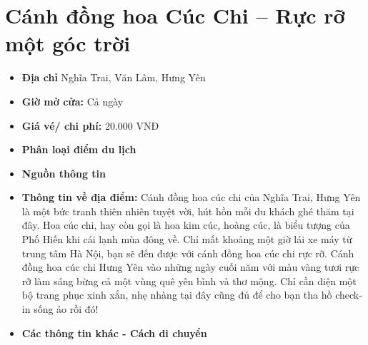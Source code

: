 \documentclass{article}
\begin{document}
\section{Cánh đồng hoa Cúc Chi – Rực rỡ một góc trời}
\begin{itemize}
    \item{\textbf{Địa chỉ}} Nghĩa Trai, Văn Lâm, Hưng Yên

    \item{\textbf{Giờ mở cửa:}} Cả ngày

    \item{\textbf{Giá vé/ chi phí:}} 20.000 VNĐ

    \item{\textbf{Phân loại điểm du lịch}}

    \item{\textbf{Nguồn thông tin}}

    \item{\textbf{Thông tin về địa điểm:}} Cánh đồng hoa cúc chi của Nghĩa Trai, Hưng Yên là một bức tranh thiên nhiên tuyệt vời, hút hồn mỗi du khách ghé thăm tại đây. Hoa cúc chi, hay còn gọi là hoa kim cúc, hoàng cúc, là biểu tượng của Phố Hiến khi cái lạnh mùa đông về. Chỉ mất khoảng một giờ lái xe máy từ trung tâm Hà Nội, bạn sẽ đến được với cánh đồng hoa cúc chi rực rỡ. Cánh đồng hoa cúc chi Hưng Yên vào những ngày cuối năm với màu vàng tươi rực rỡ làm sáng bừng cả một vùng quê yên bình và thơ mộng. Chỉ cần diện một bộ trang phục xinh xắn, nhẹ nhàng tại đây cũng đủ để cho bạn tha hồ check-in sống ảo rồi đó!
\end{itemize}

\begin{itemize}
    \item{\textbf{Các thông tin khác - Cách di chuyển}}
\end{itemize}
\end{document}
